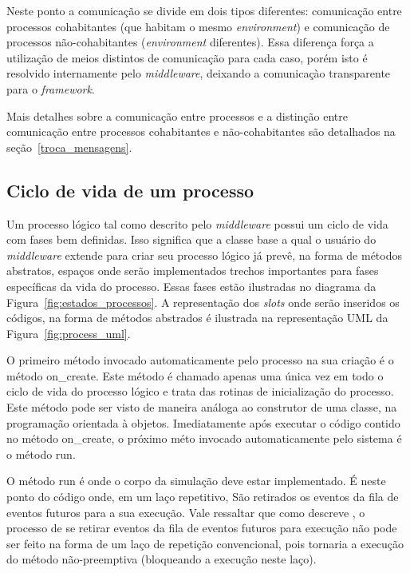 Neste ponto a comunicação se divide em dois tipos diferentes: comunicação entre processos cohabitantes (que habitam o mesmo \textit{environment}) e comunicação de processos não-cohabitantes (\textit{environment} diferentes). Essa diferença força a utilização de meios distintos de comunicação para cada caso, porém isto é resolvido internamente pelo \textit{middleware}, deixando a comunicaçào transparente para o \textit{framework}.

Mais detalhes sobre a comunicação entre processos e a distinção entre comunicação entre processos cohabitantes e não-cohabitantes são detalhados na seção~\ref{troca_mensagens}.

\subsection{Ciclo de vida de um processo}

Um processo lógico tal como descrito pelo \textit{middleware} possui um ciclo de vida com fases bem definidas. Isso significa que a classe base a qual o usuário do \textit{middleware} extende para criar seu processo lógico já prevê, na forma de métodos abstratos, espaços onde serão implementados trechos importantes para fases específicas da vida do processo. Essas fases estão ilustradas no diagrama da Figura~\ref{fig:estados_processos}. A representação dos \textit{slots} onde serão inseridos os códigos, na forma de métodos abstrados é ilustrada na representação UML da Figura~\ref{fig:process_uml}.

O primeiro método invocado automaticamente pelo processo na sua criação é o método on\_create. Este método é chamado apenas uma única vez em todo o ciclo de vida do processo lógico e trata das rotinas de inicialização do processo. Este método pode ser visto de maneira análoga ao construtor de uma classe, na programação orientada à objetos. Imediatamente após executar o código contido no método on\_create, o próximo méto invocado automaticamente pelo sistema é o método run.

O método run é onde o corpo da simulação deve estar implementado. É neste ponto do código onde, em um laço repetitivo, São retirados os eventos da fila de eventos futuros para a sua execução. Vale ressaltar que como descreve \cite{RIBEIROALVES}, o processo de se retirar eventos da fila de eventos futuros para execução não pode ser feito na forma de um laço de repetição convencional, pois tornaria a execução do método não-preemptiva (bloqueando a execução neste laço). 

